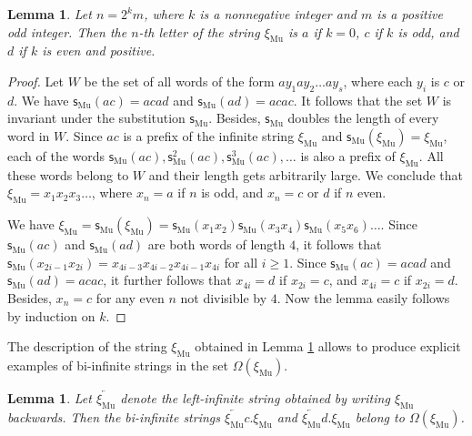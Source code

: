 \documentclass[12pt]{article}
\newtheorem{lemma}[theorem]{Lemma}
\theoremstyle{definition}
\def\Om{\Omega}
\def\subst{\mathsf{s}}
\def\sub{\subst_{\mathrm{Mu}}}
\def\xiGE{\xi_{\mathrm{Mu}}}
\begin{document}
\begin{lemma}\label{xi-GE}
Let $n=2^km$, where $k$ is a nonnegative integer and $m$ is a positive odd 
integer.  Then the $n$-th letter of the string $\xiGE$ is $a$ if $k=0$, $c$ 
if $k$ is odd, and $d$ if $k$ is even and positive.
\end{lemma}

\begin{proof}
Let $W$ be the set of all words of the form $ay_1ay_2\ldots ay_s$, where 
each $y_i$ is $c$ or $d$.  We have $\sub(ac)=acad$ and $\sub(ad)=acac$.  It 
follows that the set $W$ is invariant under the substitution $\sub$.  
Besides, $\sub$ doubles the length of every word in $W$.  Since $ac$ is a 
prefix of the infinite string $\xiGE$ and $\sub(\xiGE)=\xiGE$, each of the 
words $\sub(ac),\sub^2(ac),\sub^3(ac),\dots$ is also a prefix of $\xiGE$.  
All these words belong to $W$ and their length gets arbitrarily large.  We 
conclude that $\xiGE=x_1x_2x_3\ldots$, where $x_n=a$ if $n$ is odd, and 
$x_n=c$ or $d$ if $n$ even.

We have $\xiGE=\sub(\xiGE)=\sub(x_1x_2)\sub(x_3x_4)\sub(x_5x_6)\ldots$. 
Since $\sub(ac)$ and $\sub(ad)$ are both words of length $4$, it follows 
that $\sub(x_{2i-1}x_{2i})=x_{4i-3}x_{4i-2}x_{4i-1}x_{4i}$ for all
$i\ge1$.  Since $\sub(ac)=acad$ and $\sub(ad)=acac$, it further follows 
that $x_{4i}=d$ if $x_{2i}=c$, and $x_{4i}=c$ if $x_{2i}=d$.  Besides, 
$x_n=c$ for any even $n$ not divisible by $4$.  Now the lemma easily
follows by induction on $k$.
\end{proof}

The description of the string $\xiGE$ obtained in Lemma \ref{xi-GE} allows 
to produce explicit examples of bi-infinite strings in the set $\Om(\xiGE)$.

\begin{lemma}\label{xiGE-examples}
Let $\overleftarrow{\xiGE}$ denote the left-infinite string obtained by 
writing $\xiGE$ backwards.  Then the bi-infinite strings 
$\overleftarrow{\xiGE}c.\xiGE$ and $\overleftarrow{\xiGE}d.\xiGE$ belong to 
$\Om(\xiGE)$.
\end{lemma}
\end{document}
